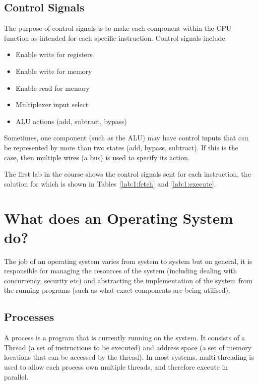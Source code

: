 \subsection{Control Signals}

The purpose of control signals is to make each component within the CPU function
as intended for each specific instruction. Control signals include:

\begin{itemize}
  \item Enable write for registers
  \item Enable write for memory
  \item Enable read for memory
  \item Multiplexer input select
  \item ALU actions (add, subtract, bypass)
\end{itemize}

Sometimes, one component (such as the ALU) may have control inputs that can be
represented by more than two states (add, bypass, subtract). If this is the
case, then multiple wires (a bus) is used to specify its action.

The first lab in the course shows the control signals sent for each instruction,
the solution for which is shown in Tables~\ref{lab:1:fetch} and
\ref{lab:1:execute}.



\section{What does an Operating System do?}

The job of an operating system varies from system to system but on general, it
is responsible for managing the resources of the system (including dealing with
concurrency, security etc) and abstracting the implementation of the system from
the running programs (such as what exact components are being utilised).

\subsection{Processes}

A process is a program that is currently running on the system. It consists of a
Thread (a set of instructions to be executed) and address space (a set of memory
locations that can be accessed by the thread). In most systems, multi-threading
is used to allow each process own multiple threads, and therefore execute in
parallel.


